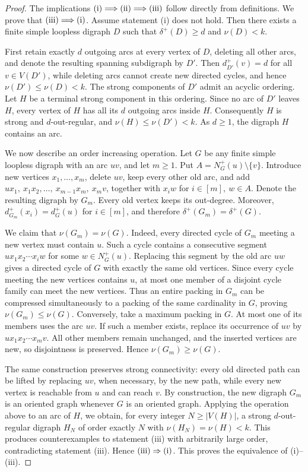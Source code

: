 \documentclass[10pt,a4paper]{article}
\numberwithin{equation}{section}
\begin{document}
\begin{proof}
The implications $\textup{(i)}\Longrightarrow\textup{(ii)}\Longrightarrow\textup{(iii)}$ follow directly from definitions. We prove that $\textup{(iii)}\Longrightarrow\textup{(i)}$. Assume statement (i) does not hold. Then there exists a finite simple loopless digraph $D$ such that $\delta^+(D)\ge d$ and $\nu(D)<k$.

First retain exactly $d$ outgoing arcs at every vertex of $D$, deleting all other arcs, and denote the resulting spanning subdigraph by $D'$. Then $d_{D'}^+(v)=d$ for all $v\in V(D')$, while deleting arcs cannot create new directed cycles, and hence $\nu(D')\le \nu(D)<k$. The strong components of $D'$ admit an acyclic ordering. Let $H$ be a terminal strong component in this ordering.
  Since no arc of $D'$ leaves $H$, every vertex of $H$ has all its $d$ outgoing arcs inside $H$. Consequently $H$ is strong and $d$-out-regular, and $\nu(H)\le \nu(D')<k$. As $d\ge1$, the digraph $H$ contains an arc.

We now describe an order increasing operation. Let $G$ be any finite simple loopless digraph with an arc $uv$, and let $m\ge1$. Put $A=N_G^+(u)\setminus\{v\}$. Introduce new vertices $x_1,\ldots,x_m$, delete $uv$, keep every other old arc, and add $ux_1,\ x_1x_2,\ldots,\ x_{m-1}x_m,\ x_mv$, together with $x_iw$ for $i\in[m],\ w\in A$. Denote the resulting digraph by $G_m$. Every old vertex keeps its out-degree. Moreover, $d_{G_m}^+(x_i)=d_G^+(u)$ for $i\in[m]$, and therefore $\delta^+(G_m)=\delta^+(G)$.

We claim that $\nu(G_m)=\nu(G)$. Indeed, every directed cycle of $G_m$ meeting a new vertex must contain $u$. Such a cycle contains a consecutive segment $ux_1x_2\cdots x_iw$ for some $w\in N_G^+(u)$. Replacing this segment by the old arc $uw$ gives a directed cycle of $G$ with exactly the same old vertices. Since every cycle meeting the new vertices contains $u$, at most one member of a disjoint cycle family can meet the new vertices. Thus an entire packing in $G_m$ can be compressed simultaneously to a packing of the same cardinality in $G$, proving $\nu(G_m)\le \nu(G)$. Conversely, take a maximum packing in $G$. At most one of its members uses the arc $uv$. If such a member exists, replace its occurrence of $uv$ by $ux_1x_2\cdots x_mv$. All other members remain unchanged, and the inserted vertices are new, so disjointness is preserved. Hence $\nu(G_m)\ge \nu(G)$. 

The same construction preserves strong connectivity: every old directed path can be lifted by replacing $uv$, when necessary, by the new path, while every new vertex is reachable from $u$ and can reach $v$. By construction, the new digraph $G_m$ is an oriented graph whenever $G$ is an oriented graph. Applying the operation above to an arc of $H$, we obtain, for every integer $N\ge |V(H)|$, a strong $d$-out-regular digraph $H_N$ of order exactly $N$ with $\nu(H_N)=\nu(H)<k$. This produces counterexamples to statement (iii) with arbitrarily large order, contradicting statement (iii). Hence $\textup{(iii)}\Rightarrow\textup{(i)}$. This proves the equivalence of (i)--(iii).
\end{proof}
\end{document}
